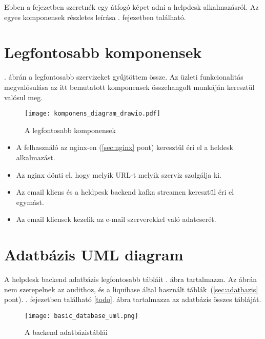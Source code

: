 Ebben a fejezetben szeretnék egy átfogó képet adni a helpdesk alkalmazásról. Az egyes komponensek részletes leírása . fejezetben található.

\section{Legfontosabb komponensek}

. ábrán a legfontosabb szervizeket gyűjtöttem össze. Az üzleti funkcionalitás megvalósulása az itt bemutatott komponensek összehangolt munkáján keresztül valósul meg.

\begin{figure}[hbt] 
	\centering
	\texttt{[image: komponens\_diagram\_drawio.pdf]}
	\caption{A legfontosabb komponensek}
	\label{fig:komponens_diagram}
\end{figure}


\begin{itemize}
	\item A felhasználó az nginx-en (\ref{sec:nginx} pont) keresztül éri el a heldesk alkalmazást.
	\item Az nginx dönti el, hogy melyik URL-t melyik szerviz szolgálja ki.
	\item Az email kliens és a heldpesk backend kafka streamen keresztül éri el egymást.
	\item Az email kliensek kezelik az e-mail szerverekkel való adatcserét.
\end{itemize}


\section{Adatbázis UML diagram}
A helpdesk backend adatbázis legfontosabb tábláit . ábra tartalmazza. Az ábrán nem szerepelnek az audithoz, és a liquibase által  használt táblák~(\ref{sec:adatbazis} pont). . fejezetben található \ref{todo}. ábra tartalmazza az adatbázis összes tábláját.
 


\begin{figure}[hbt] 
	\centering
	\texttt{[image: basic\_database\_uml.png]}
	\caption{A backend adatbázistáblái}
	\label{fig:basic_database_uml}
\end{figure}


